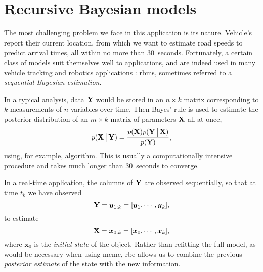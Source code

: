 \section{Recursive Bayesian models}
\label{sec:recursive-bayes}

The most challenging problem we face in this application is its \rt{} nature. Vehicle's report their current location, from which we want to estimate road speeds to predict arrival times, all within no more than 30~seconds. Fortunately, a certain class of models suit themselves well to \rt{} applications, and are indeed used in many vehicle tracking and robotics applications \citep{Anderson_2012,Gustafsson_2002,Mutambara_2000}: \glspl{rbm}, sometimes referred to a \emph{sequential Bayesian estimation}.


In a typical analysis, data $\mathbf{Y}$ would be stored in an $n\times k$ matrix corresponding to $k$ measurements of $n$ variables over time. Then Bayes' rule is used to estimate the posterior distribution of an $m\times k$ matrix of parameters $\mathbf{X}$ all at once,
\begin{equation}
\label{eq:bayes}
p(\mathbf{X}\,\big|\,{}\mathbf{Y}) =
\frac{
    p(\mathbf{X})
    p(\mathbf{Y}\,\big|\,{}\mathbf{X})
}{
    p(\mathbf{Y})
},
\end{equation}
using, for example,  algorithm. This is usually a computationally intensive procedure and takes much longer than 30~seconds to converge.


In a real-time application, the columns of $\mathbf{Y}$ are observed sequentially, so that at time $t_k$ we have observed
\begin{equation}
\label{eq:bayes_y_vector}
\mathbf{Y} = \boldsymbol{y}_{1:k} = [\boldsymbol{y}_1,\cdots,\boldsymbol{y}_k],
\end{equation}
to estimate
\begin{equation}
\label{eq:bayes_x_vector}
\mathbf{X} = \boldsymbol x_{0:k} = [\boldsymbol{x}_0,\cdots,\boldsymbol{x}_k],
\end{equation}
where $\boldsymbol{x}_0$ is the \emph{initial state} of the object. Rather than refitting the full model, as would be necessary when using \gls{mcmc}, \gls{rbe} allows us to combine the previous \emph{posterior estimate} of the state with the new information.


